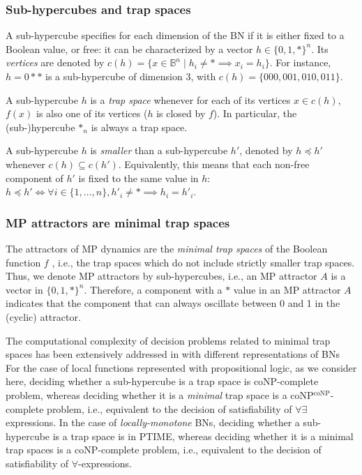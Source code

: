 \documentclass[PCJ,Unicode,screen,mode=plain]{cedram}
\begin{document}
\hypertarget{sub-hypercubes-and-trap-spaces}{%
\subsubsection{Sub-hypercubes and trap
spaces}\label{sub-hypercubes-and-trap-spaces}}

A sub-hypercube specifies for each dimension of the BN if it is either
fixed to a Boolean value, or free: it can be characterized by a vector
\(h\in \{0,1,*\}^n\). Its \emph{vertices} are denoted by
\(c(h) = \{ x\in \mathbb B^n\mid h_i\neq *\implies x_i=h_i\}\). For
instance, \(h=0**\) is a sub-hypercube of dimension 3, with
\(c(h) = \{000, 001, 010, 011\}\).

A sub-hypercube \(h\) is a \emph{trap space} whenever for each of its
vertices \(x\in c(h)\), \(f(x)\) is also one of its vertices (\(h\) is
closed by \(f\)). In particular, the (sub-)hypercube \(\mathbf *_n\) is
always a trap space.

A sub-hypercube \(h\) is \emph{smaller} than a sub-hypercube \(h'\),
denoted by \(h \preceq h'\) whenever \(c(h)\subseteq c(h')\).
Equivalently, this means that each non-free component of \(h'\) is fixed
to the same value in \(h\):
\(h \preceq h' \iff \forall i\in \{1,\ldots,n\}, h'_i\neq *\implies h_i=h'_i\).

\hypertarget{mp-attractors-are-minimal-trap-spaces}{%
\subsubsection{MP attractors are minimal trap
spaces}\label{mp-attractors-are-minimal-trap-spaces}}

The attractors of MP dynamics are the \emph{minimal trap spaces} of the
Boolean function \(f\) \citep{Pauleve2020}, i.e., the trap spaces which
do not include strictly smaller trap spaces. Thus, we denote MP
attractors by sub-hypercubes, i.e., an MP attractor \(A\) is a vector in
\(\{0,1,*\}^n\). Therefore, a component with a \(*\) value in an MP
attractor \(A\) indicates that the component that can always oscillate
between 0 and 1 in the (cyclic) attractor.

The computational complexity of decision problems related to minimal
trap spaces has been extensively addressed in
\citep{TrapSpaceComplexity} with different representations of BNs
For the case of local functions represented with propositional
logic, as we consider here, deciding whether a sub-hypercube is a trap
space is coNP-complete problem, whereas deciding whether it is a
\emph{minimal} trap space is a coNP\(^\text{coNP}\)-complete problem,
i.e., equivalent to the decision of satisfiability of \(\forall\exists\)
expressions. In the case of \emph{locally-monotone} BNs, deciding
whether a sub-hypercube is a trap space is in PTIME, whereas deciding
whether it is a minimal trap spaces is a coNP-complete problem, i.e.,
equivalent to the decision of satisfiability of \(\forall\)-expressions.
\end{document}

